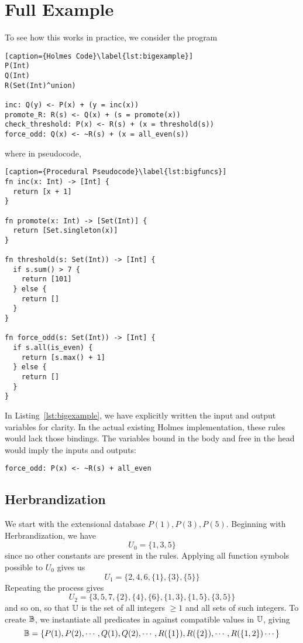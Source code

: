 \section{Full Example}
To see how this works in practice, we consider the program
\begin{lstlisting}[caption={Holmes Code}\label{lst:bigexample}] 
P(Int)
Q(Int)
R(Set(Int)^union)

inc: Q(y) <- P(x) + (y = inc(x))
promote_R: R(s) <- Q(x) + (s = promote(x))
check_threshold: P(x) <- R(s) + (x = threshold(s))
force_odd: Q(x) <- ~R(s) + (x = all_even(s))
\end{lstlisting}
where in pseudocode,
\begin{lstlisting}[caption={Procedural Pseudocode}\label{lst:bigfuncs}]
fn inc(x: Int) -> [Int] {
  return [x + 1]
}

fn promote(x: Int) -> [Set(Int)] {
  return [Set.singleton(x)]
}

fn threshold(s: Set(Int)) -> [Int] {
  if s.sum() > 7 {
    return [101]  
  } else {
    return []
  }
}

fn force_odd(s: Set(Int)) -> [Int] {
  if s.all(is_even) {
    return [s.max() + 1]
  } else {
    return []
  }
}
\end{lstlisting}

In Listing~\ref{lst:bigexample}, we have explicitly written the input and output variables for clarity.
In the actual existing Holmes implementation, these rules would lack those bindings.
The variables bound in the body and free in the head would imply the inputs and outputs:
\begin{lstlisting}[numbers=none]
force_odd: P(x) <- ~R(s) + all_even
\end{lstlisting}


\subsection{Herbrandization}
We start with the extensional database $P(1), P(3), P(5)$.
Beginning with Herbrandization, we have
\[
	U_0 = \{1, 3, 5\}
\]
since no other constants are present in the rules.
Applying all function symbols possible to $U_0$ gives us
\[
	U_1 = \{2, 4, 6, \{1\}, \{3\}, \{5\}\}
\]
Repeating the process gives
\[
	U_2 = \{3, 5, 7, \{2\}, \{4\}, \{6\}, \{1, 3\}, \{1, 5\}, \{3, 5\}\}
\]
and so on, so that $\mathbb{U}$ is the set of all integers $\geq 1$ and all sets of such integers.
To create $\mathbb{B}$, we instantiate all predicates in against compatible values in $\mathbb{U}$, giving
\[
	\mathbb{B} = \{P(1), P(2), \cdots, Q(1), Q(2), \cdots, R(\{1\}), R(\{2\}), \cdots, R(\{1, 2\}) \cdots\}
\]

